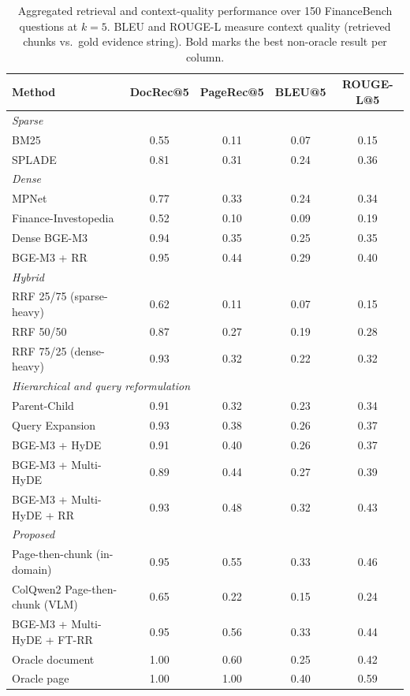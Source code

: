 \documentclass[12pt,twoside,maitrise]{dms}
\theoremstyle{definition}
\numberwithin{equation}{section}
\numberwithin{table}{chapter}
\numberwithin{figure}{chapter}
\begin{document}
\begin{table}[ht]
\centering
\caption{Aggregated retrieval and context-quality performance over 150 FinanceBench
  questions at $k=5$.  BLEU and ROUGE-L measure context quality (retrieved chunks
  vs.\ gold evidence string).  Bold marks the best non-oracle result per column.}
\label{tab:retrieval}
\scriptsize
\renewcommand{\arraystretch}{0.86}
\setlength{\tabcolsep}{3pt}
\begin{tabularx}{\textwidth}{Xcccc}
\toprule
\textbf{Method} & \textbf{DocRec@5} & \textbf{PageRec@5}
  & \textbf{BLEU@5} & \textbf{ROUGE-L@5} \\
\midrule
\multicolumn{5}{l}{\textit{Sparse}} \\
BM25                                  & 0.55 & 0.11 & 0.07 & 0.15 \\
SPLADE                                & 0.81 & 0.31 & 0.24 & 0.36 \\
\midrule
\multicolumn{5}{l}{\textit{Dense}} \\
MPNet                                 & 0.77 & 0.33 & 0.24 & 0.34 \\
Finance-Investopedia                  & 0.52 & 0.10 & 0.09 & 0.19 \\
Dense BGE-M3                          & 0.94 & 0.35 & 0.25 & 0.35 \\
BGE-M3 + RR                           & 0.95 & 0.44 & 0.29 & 0.40 \\
\midrule
\multicolumn{5}{l}{\textit{Hybrid}} \\
RRF 25/75 (sparse-heavy)              & 0.62 & 0.11 & 0.07 & 0.15 \\
RRF 50/50                             & 0.87 & 0.27 & 0.19 & 0.28 \\
RRF 75/25 (dense-heavy)               & 0.93 & 0.32 & 0.22 & 0.32 \\
\midrule
\multicolumn{5}{l}{\textit{Hierarchical and query reformulation}} \\
Parent-Child                          & 0.91 & 0.32 & 0.23 & 0.34 \\
Query Expansion                       & 0.93 & 0.38 & 0.26 & 0.37 \\
BGE-M3 + HyDE                         & 0.91 & 0.40 & 0.26 & 0.37 \\
BGE-M3 + Multi-HyDE                   & 0.89 & 0.44 & 0.27 & 0.39 \\
BGE-M3 + Multi-HyDE + RR              & 0.93 & 0.48 & 0.32 & 0.43 \\
\midrule
\multicolumn{5}{l}{\textit{Proposed}} \\
Page-then-chunk (in-domain)           & 0.95 & 0.55 & 0.33 & 0.46 \\
ColQwen2 Page-then-chunk (VLM)           & 0.65 & 0.22 & 0.15 & 0.24 \\
BGE-M3 + Multi-HyDE + FT-RR          & 0.95 & 0.56 & 0.33  & 0.44 \\
\midrule
Oracle document                       & 1.00 & 0.60 & 0.25 & 0.42 \\
Oracle page                           & 1.00 & 1.00 & 0.40 & 0.59 \\
\bottomrule
\end{tabularx}
\end{table}
\end{document}
